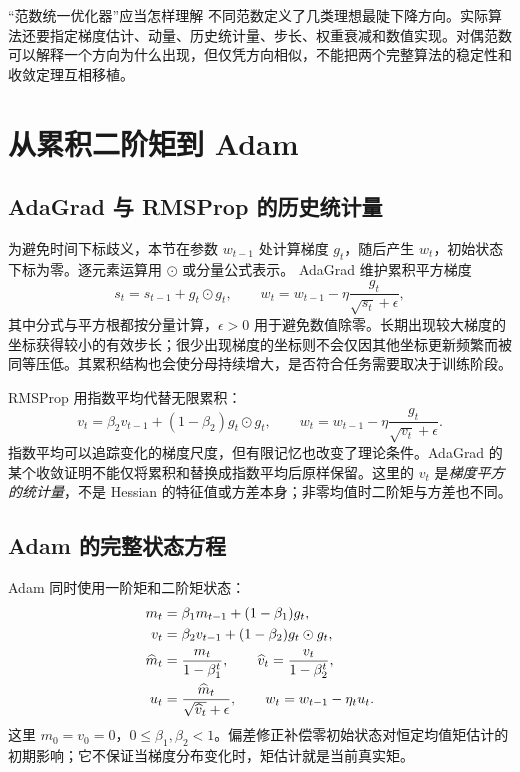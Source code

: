 \begin{coursebox}{“范数统一优化器”应当怎样理解}
不同范数定义了几类理想最陡下降方向。实际算法还要指定梯度估计、动量、历史统计量、步长、权重衰减和数值实现。对偶范数可以解释一个方向为什么出现，但仅凭方向相似，不能把两个完整算法的稳定性和收敛定理互相移植。
\end{coursebox}

\section{从累积二阶矩到 Adam}
\label{l4:adaptive}

\subsection{AdaGrad 与 RMSProp 的历史统计量}

为避免时间下标歧义，本节在参数 $w_{t-1}$ 处计算梯度 $g_t$，随后产生 $w_t$，初始状态下标为零。逐元素运算用 $\odot$ 或分量公式表示。
AdaGrad 维护累积平方梯度\citep{Duchi2011}
\begin{equation}
 s_t=s_{t-1}+g_t\odot g_t,
 \qquad
 w_t=w_{t-1}-\eta\frac{g_t}{\sqrt{s_t}+\epsilon},
 \label{l4:adagrad}
\end{equation}
其中分式与平方根都按分量计算，$\epsilon>0$ 用于避免数值除零。长期出现较大梯度的坐标获得较小的有效步长；很少出现梯度的坐标则不会仅因其他坐标更新频繁而被同等压低。其累积结构也会使分母持续增大，是否符合任务需要取决于训练阶段。

RMSProp 用指数平均代替无限累积：
\begin{equation}
 v_t=\beta_2v_{t-1}+(1-\beta_2)g_t\odot g_t,
 \qquad
 w_t=w_{t-1}-\eta\frac{g_t}{\sqrt{v_t}+\epsilon}.
 \label{l4:rmsprop}
\end{equation}
指数平均可以追踪变化的梯度尺度，但有限记忆也改变了理论条件。AdaGrad 的某个收敛证明不能仅将累积和替换成指数平均后原样保留。这里的 $v_t$ 是\emph{梯度平方的统计量}，不是 Hessian 的特征值或方差本身；非零均值时二阶矩与方差也不同。

\subsection{Adam 的完整状态方程}

Adam 同时使用一阶矩和二阶矩状态\citep{Kingma2015}：
\begin{align}
 m_t&=\beta_1m_{t-1}+(1-\beta_1)g_t,\notag\\
 v_t&=\beta_2v_{t-1}+(1-\beta_2)g_t\odot g_t,\notag\\
 \widehat m_t&=\frac{m_t}{1-\beta_1^t},\qquad
 \widehat v_t=\frac{v_t}{1-\beta_2^t},\notag\\
 u_t&=\frac{\widehat m_t}{\sqrt{\widehat v_t}+\epsilon},\qquad
 w_t=w_{t-1}-\eta_tu_t.
 \label{l4:adam}
\end{align}
这里 $m_0=v_0=0$，$0\leq\beta_1,\beta_2<1$。偏差修正补偿零初始状态对恒定均值矩估计的初期影响；它不保证当梯度分布变化时，矩估计就是当前真实矩。


